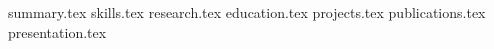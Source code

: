 \documentclass[11pt, a4paper]{awesome-cv}
\newcommand*{\sectiondir}{./sections/}
\begin{document}
	\makecvheader[C]


	{summary.tex}
	{skills.tex}
	{research.tex}
	{education.tex}
	{projects.tex}
	{publications.tex}
	{presentation.tex}
\end{document}
